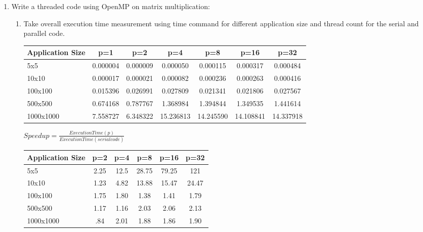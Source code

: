 \documentclass{sem5}
\begin{document}
\begin{enumerate}
\item Write a threaded code using OpenMP on matrix multiplication:
\begin{enumerate}
\item Take overall execution time measurement using time command for different application size and thread count for the serial and parallel code.
\begin{center}
\begin{tabular}{|l|c|c|c|c|c|c|}
\hline
Application Size & p=1 & p=2 & p=4 & p=8 & p=16 & p=32\\
\hline
5x5 & 0.000004&0.000009&0.000050&0.000115&0.000317&0.000484\\
\hline
10x10 &0.000017 &0.000021&0.000082&0.000236&0.000263&0.000416\\
\hline
100x100 & 0.015396&0.026991&0.027809&0.021341&0.021806&0.027567\\
\hline
500x500 &  0.674168&0.787767&1.368984&1.394844&1.349535&1.441614\\
\hline
1000x1000 &7.558727 &6.348322&15.236813&14.245590&14.108841&14.337918\\
\hline
\end{tabular}
\end{center}

\begin{center}
$Speedup = \frac{Execution Time(p)}{Execution Time(serial code)}$
\end{center}

\begin{center}
\begin{tabular}{|l|c|c|c|c|c|}
\hline
Application Size & p=2 & p=4 & p=8 & p=16 & p=32\\
\hline
5x5 & 2.25 & 12.5 & 28.75 & 79.25 & 121 \\
\hline
10x10 & 1.23 & 4.82 & 13.88 & 15.47 & 24.47\\
\hline
100x100 & 1.75 & 1.80 & 1.38 & 1.41 & 1.79\\
\hline
500x500 & 1.17 & 1.16 & 2.03 &  2.06 & 2.13 \\
\hline
1000x1000 & .84 & 2.01 & 1.88 & 1.86 & 1.90\\
\hline
\end{tabular}
\end{center}


\end{enumerate}
\end{enumerate}
\end{document}
